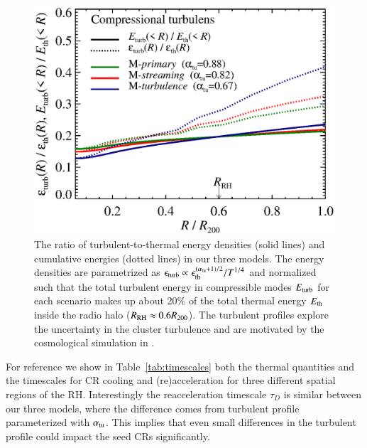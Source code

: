 \documentclass[fleqn,usenatbib,useAMS]{mnras}
\begin{document}
\begin{figure}
  \includegraphics[width=1.0\columnwidth]{turb_profile_ratio_tot.eps}
  \caption{The ratio of turbulent-to-thermal energy densities (solid
    lines) and cumulative energies (dotted lines) in our three
    models. The energy densities are parametrized as
    $\epsilon_{\mathrm{turb}} \propto
    \epsilon_{\mathrm{th}}^{(\alpha_{{\mathrm{tu}}}+1)/2}/T^{1/4}$ and
    normalized such that the total turbulent energy in compressible
    modes $E_{\mathrm{turb}}$ for each scenario makes up about 20\% of the
    total thermal energy $E_{\mathrm{th}}$ inside the radio halo
    ($R_{\mathrm{RH}}\approx0.6R_{200}$). The turbulent profiles explore
    the uncertainty in the cluster turbulence and are motivated by the
    cosmological simulation in
    \citep{2009ApJ...705.1129L,2010ApJ...725.1452S,2011A&A...529A..17V}.}
  \label{fig:turb}
\end{figure}

For reference we show in Table~\ref{tab:timescales} both the thermal
quantities and the timescales for CR cooling and (re)acceleration for
three different spatial regions of the RH. Interestingly the
reacceleration timescale $\tau_D$ is similar between our three models,
where the difference comes from turbulent profile parameterized with
$\alpha_{\mathrm{tu}}$. This implies that even small differences in the
turbulent profile could impact the seed CRs significantly.
\end{document}
